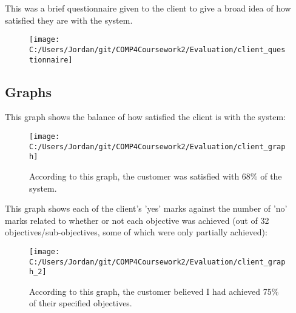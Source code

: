 This was a brief questionnaire given to the client to give a broad idea of how satisfied they are with the system.

\begin{figure}[H]
	\texttt{[image: C:/Users/Jordan/git/COMP4Coursework2/Evaluation/client\_questionnaire]}
\end{figure}

\subsection{Graphs}

This graph shows the balance of how satisfied the client is with the system:

\begin{figure}[H]
	\texttt{[image: C:/Users/Jordan/git/COMP4Coursework2/Evaluation/client\_graph]}
	\caption{According to this graph, the customer was satisfied with 68\% of the system.}
\end{figure}

This graph shows each of the client's 'yes' marks  against the number of 'no' marks related to whether or not each objective was achieved (out of 32 objectives/sub-objectives, some of which were only partially achieved):

\begin{figure}[H]
	\texttt{[image: C:/Users/Jordan/git/COMP4Coursework2/Evaluation/client\_graph\_2]}
	\caption{According to this graph, the customer believed I had achieved 75\% of their specified objectives.}
\end{figure}